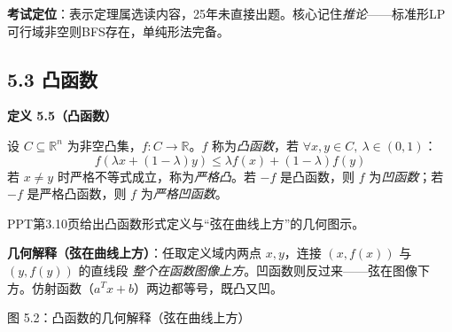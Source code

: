 \begin{notebox}
\textbf{考试定位}：表示定理属选读内容，25年未直接出题。核心记住\emph{推论}——标准形LP可行域非空则BFS存在，单纯形法完备。
\end{notebox}

\subsection{5.3 凸函数}

\begin{defbox}
\textbf{定义 5.5（凸函数）}

设 $C \subseteq \mathbb{R}^n$ 为非空凸集，$f: C \to \mathbb{R}$。$f$ 称为\emph{凸函数}，若 $\forall x,y\in C,\ \lambda\in(0,1)$：
\[
f(\lambda x + (1-\lambda) y) \le \lambda f(x) + (1-\lambda) f(y)
\]
若 $x\neq y$ 时严格不等式成立，称为\emph{严格凸}。若 $-f$ 是凸函数，则 $f$ 为\emph{凹函数}；若 $-f$ 是严格凸函数，则 $f$ 为\emph{严格凹函数}。
\end{defbox}

\medskip
PPT第3.10页给出凸函数形式定义与“弦在曲线上方”的几何图示。
\medskip
{}
\medskip

\begin{notebox}
\textbf{几何解释（弦在曲线上方）}：任取定义域内两点 $x,y$，连接 $(x,f(x))$ 与 $(y,f(y))$ 的直线段 \emph{整个在函数图像上方}。凹函数则反过来——弦在图像下方。仿射函数（$a^Tx+b$）两边都等号，既凸又凹。
\end{notebox}

\begin{center}
\vspace{2pt}
{\small 图 5.2：凸函数的几何解释（弦在曲线上方）\par}
\end{center}

